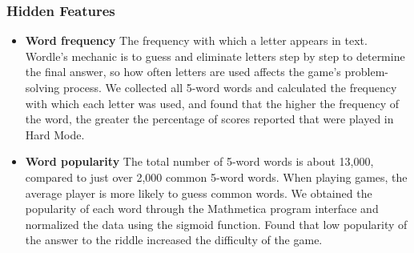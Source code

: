 \documentclass{mcmthesis}
\begin{document}
\subsubsection{Hidden Features}
\begin{itemize}
	\item \textbf{Word frequency} The frequency with which a letter appears in text. Wordle's mechanic is to guess and eliminate letters step by step to determine the final answer, so how often letters are used affects the game's problem-solving process. We collected all 5-word words and calculated the frequency with which each letter was used, and found that the higher the frequency of the word, the greater the percentage of scores reported that were played in Hard Mode.
	
	\item \textbf{Word popularity} The total number of 5-word words is about 13,000, compared to just over 2,000 common 5-word words. When playing games, the average player is more likely to guess common words. We obtained the popularity of each word through the Mathmetica program interface and normalized the data using the sigmoid function. Found that low popularity of the answer to the riddle increased the difficulty of the game.
\end{itemize}
%
%
%
%
\end{document}
